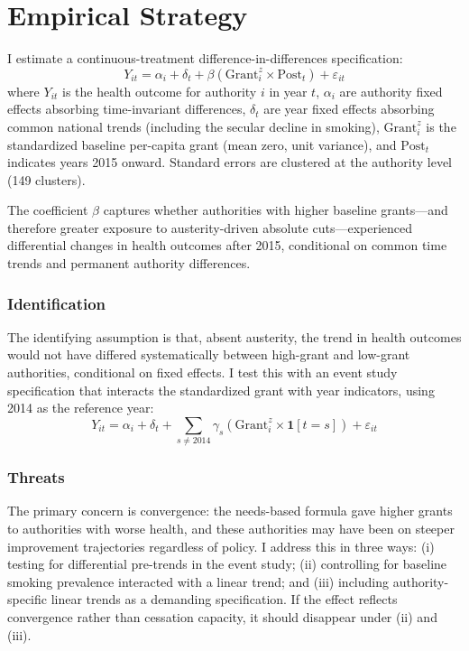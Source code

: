 \documentclass[12pt]{article}
\begin{document}


\section{Empirical Strategy}

I estimate a continuous-treatment difference-in-differences specification:
\begin{equation}
Y_{it} = \alpha_i + \delta_t + \beta \left( \text{Grant}^z_i \times \text{Post}_t \right) + \varepsilon_{it}
\label{eq:did}
\end{equation}
where $Y_{it}$ is the health outcome for authority $i$ in year $t$, $\alpha_i$ are authority fixed effects absorbing time-invariant differences, $\delta_t$ are year fixed effects absorbing common national trends (including the secular decline in smoking), $\text{Grant}^z_i$ is the standardized baseline per-capita grant (mean zero, unit variance), and $\text{Post}_t$ indicates years 2015 onward. Standard errors are clustered at the authority level (149 clusters).

The coefficient $\beta$ captures whether authorities with higher baseline grants---and therefore greater exposure to austerity-driven absolute cuts---experienced differential changes in health outcomes after 2015, conditional on common time trends and permanent authority differences.

\subsubsection*{Identification} The identifying assumption is that, absent austerity, the trend in health outcomes would not have differed systematically between high-grant and low-grant authorities, conditional on fixed effects. I test this with an event study specification that interacts the standardized grant with year indicators, using 2014 as the reference year:
\begin{equation}
Y_{it} = \alpha_i + \delta_t + \sum_{s \neq 2014} \gamma_s \left( \text{Grant}^z_i \times \mathbf{1}[t = s] \right) + \varepsilon_{it}
\label{eq:es}
\end{equation}

\subsubsection*{Threats} The primary concern is convergence: the needs-based formula gave higher grants to authorities with worse health, and these authorities may have been on steeper improvement trajectories regardless of policy. I address this in three ways: (i) testing for differential pre-trends in the event study; (ii) controlling for baseline smoking prevalence interacted with a linear trend; and (iii) including authority-specific linear trends as a demanding specification. If the effect reflects convergence rather than cessation capacity, it should disappear under (ii) and (iii).
\end{document}
